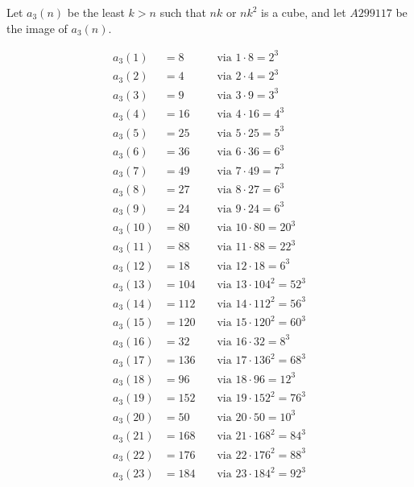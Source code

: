 \documentclass{article}
\begin{document}
Let $a_3(n)$ be the least $k > n$ such that $nk$ or $nk^2$ is a cube, and
let $A299117$ be the image of $a_3(n)$.
  \allowdisplaybreaks
  \begin{multicols}{3}
    \noindent
    \begin{alignat*}{2}
      a_3(1)  &= 8   &&\text{ via } 1  \cdot 8     = 2^3 \\
      a_3(2)  &= 4   &&\text{ via } 2  \cdot 4     = 2^3 \\
      a_3(3)  &= 9   &&\text{ via } 3  \cdot 9     = 3^3 \\
      a_3(4)  &= 16  &&\text{ via } 4  \cdot 16    = 4^3 \\
      a_3(5)  &= 25  &&\text{ via } 5  \cdot 25    = 5^3 \\
      a_3(6)  &= 36  &&\text{ via } 6  \cdot 36    = 6^3 \\
      a_3(7)  &= 49  &&\text{ via } 7  \cdot 49    = 7^3 \\
      a_3(8)  &= 27  &&\text{ via } 8  \cdot 27    = 6^3 \\
      a_3(9)  &= 24  &&\text{ via } 9  \cdot 24    = 6^3 \\
      a_3(10) &= 80  &&\text{ via } 10 \cdot 80    = 20^3 \\
      a_3(11) &= 88  &&\text{ via } 11 \cdot 88    = 22^3 \\
      a_3(12) &= 18  &&\text{ via } 12 \cdot 18    = 6^3 \\
      a_3(13) &= 104 &&\text{ via } 13 \cdot 104^2 = 52^3 \\
      a_3(14) &= 112 &&\text{ via } 14 \cdot 112^2 = 56^3 \\
      a_3(15) &= 120 &&\text{ via } 15 \cdot 120^2 = 60^3 \\
      a_3(16) &= 32  &&\text{ via } 16 \cdot 32    = 8^3 \\
      a_3(17) &= 136 &&\text{ via } 17 \cdot 136^2 = 68^3 \\
      a_3(18) &= 96  &&\text{ via } 18 \cdot 96    = 12^3 \\
      a_3(19) &= 152 &&\text{ via } 19 \cdot 152^2 = 76^3 \\
      a_3(20) &= 50  &&\text{ via } 20 \cdot 50    = 10^3 \\
      a_3(21) &= 168 &&\text{ via } 21 \cdot 168^2 = 84^3 \\
      a_3(22) &= 176 &&\text{ via } 22 \cdot 176^2 = 88^3 \\
      a_3(23) &= 184 &&\text{ via } 23 \cdot 184^2 = 92^3 \\

\end{alignat*}
\end{multicols}
\end{document}
